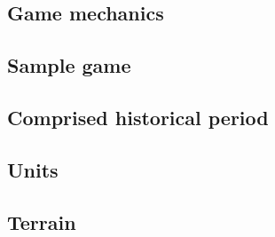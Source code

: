 
\subsection{Game mechanics}

\subsection{Sample game}

\subsection{Comprised historical period}

\subsection{Units}

\subsection{Terrain}
